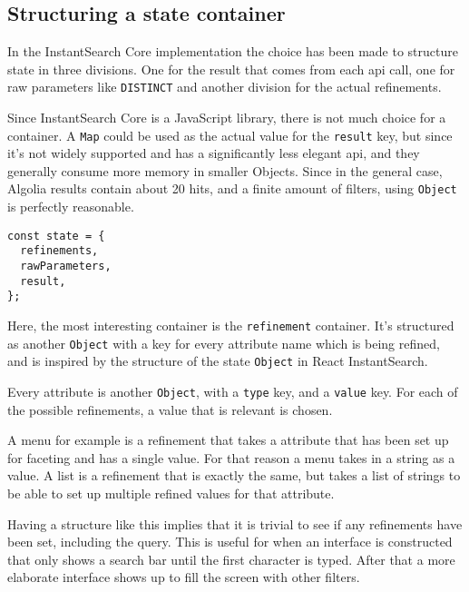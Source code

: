 \subsection{Structuring a state container}
\label{sub:structuring_a_state_container}

In the InstantSearch Core implementation the choice has been made to structure state in three divisions. One for the result that comes from each \acrshort{api} call, one for raw parameters like {\tt DISTINCT} and another division for the actual \glspl{refinement}.

Since InstantSearch Core is a JavaScript \gls{library}, there is not much choice for a container. A {\tt Map}\cite{mdn-map} could be used as the actual value for the {\tt result} key, but since it's not widely supported and has a significantly less elegant \acrshort{api}, and they generally consume more memory in smaller Objects. Since in the general case, Algolia results contain about 20 hits, and a finite amount of filters, using {\tt Object} is perfectly reasonable.

\begin{minipage}{\linewidth}
\begin{lstlisting}[caption={The state container of InstantSearch Core},label={lst:is-core-state-1}]
const state = {
  refinements,
  rawParameters,
  result,
};
\end{lstlisting}
\end{minipage}

Here, the most interesting container is the {\tt refinement} container. It's structured as another {\tt Object} with a key for every \gls{attribute} name which is being refined, and is inspired by the structure of the state {\tt Object} in React InstantSearch\cite{react-instantsearch-search-state}.

Every \gls{attribute} is another {\tt Object}, with a {\tt type} key, and a {\tt value} key. For each of the possible \glspl{refinement}, a value that is relevant is chosen. 

A menu for example is a \gls{refinement} that takes a \gls{attribute} that has been set up for faceting\cite{algolia-set-up-faceting} and has a single value. For that reason a menu takes in a string as a value. A list is a \gls{refinement} that is exactly the same, but takes a list of strings to be able to set up multiple refined values for that attribute.

Having a structure like this implies that it is trivial to see if any \glspl{refinement} have been set, including the query. This is useful for when an interface is constructed that only shows a search bar until the first character is typed. After that a more elaborate interface shows up to fill the screen with other filters.

